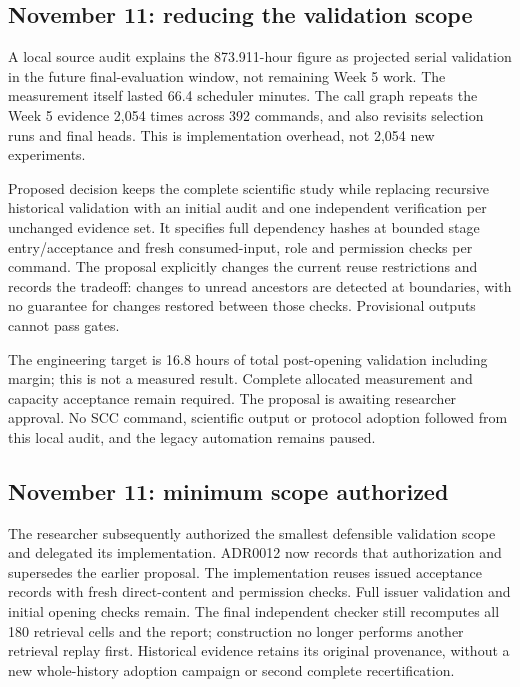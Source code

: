 \subsection*{November 11: reducing the validation scope}

A local source audit explains the 873.911-hour figure as projected serial
validation in the future final-evaluation window, not remaining Week 5 work.
The measurement itself lasted 66.4 scheduler minutes. The call graph repeats
the Week 5 evidence 2,054 times across 392 commands, and also revisits selection
runs and final heads. This is implementation overhead, not 2,054 new experiments.

Proposed decision  keeps
the complete scientific study while replacing recursive historical validation
with an initial audit and one independent verification per unchanged evidence
set. It specifies full dependency hashes at bounded stage entry/acceptance and
fresh consumed-input, role and permission checks per command. The proposal
explicitly changes the current reuse restrictions and records the tradeoff:
changes to unread ancestors are detected at boundaries, with no guarantee for
changes restored between those checks. Provisional outputs cannot pass gates.

The engineering target is 16.8 hours of total post-opening validation including
margin; this is not a measured result. Complete allocated measurement and
capacity acceptance remain required. The proposal is awaiting researcher
approval. No SCC command, scientific output or protocol adoption followed from
this local audit, and the legacy automation remains paused.

\subsection*{November 11: minimum scope authorized}

The researcher subsequently authorized the smallest defensible validation scope
and delegated its implementation. ADR0012 now records that authorization and
supersedes the earlier proposal. The implementation reuses issued acceptance
records with fresh direct-content and permission checks. Full issuer validation
and initial opening checks remain. The final independent checker still recomputes
all 180 retrieval cells and the report; construction no longer performs another
retrieval replay first. Historical evidence retains its original provenance,
without a new whole-history adoption campaign or second complete recertification.

